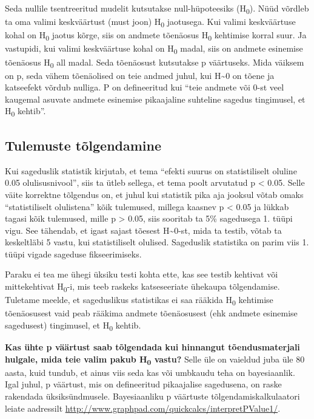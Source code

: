 \documentclass[]{book}
\begin{document}
Seda nullile tsentreeritud mudelit kutsutakse null-hüpoteesiks (H\textsubscript{0}).
Nüüd võrdleb ta oma valimi keskväärtust (must joon) H\textsubscript{0} jaotusega.
Kui valimi keskväärtuse kohal on H\textsubscript{0} jaotus kõrge, siis on andmete tõenäosus H\textsubscript{0} kehtimise korral suur.
Ja vastupidi, kui valimi keskväärtuse kohal on H\textsubscript{0} madal, siis on andmete esinemise tõenäosus H\textsubscript{0} all madal.
Seda tõenäosust kutsutakse p väärtuseks.
Mida väiksem on p, seda vähem tõenäolised on teie andmed juhul, kui H\textasciitilde{}0 on tõene ja katseefekt võrdub nulliga.
P on defineeritud kui ``teie andmete või 0-st veel kaugemal asuvate andmete esinemise pikaajaline suhteline sagedus tingimusel, et H\textsubscript{0} kehtib''.

\hypertarget{tulemuste-tolgendamine}{%
\subsection*{Tulemuste tõlgendamine}\label{tulemuste-tolgendamine}}

Kui sageduslik statistik kirjutab, et tema ``efekti suurus on statistiliselt oluline 0.05 olulisusnivool'', siis ta ütleb sellega, et tema poolt arvutatud p \textless{} 0.05.
Selle väite korrektne tõlgendus on, et juhul kui statistik pika aja jooksul võtab omaks ``statistiliselt olulistena'' kõik tulemused, millega kaasnev p \textless{} 0.05 ja lükkab tagasi kõik tulemused, mille p \textgreater{} 0.05, siis sooritab ta 5\% sagedusega 1. tüüpi vigu.
See tähendab, et igast sajast tõesest H\textasciitilde{}0-st, mida ta testib, võtab ta keskeltläbi 5 vastu, kui statistiliselt olulised.
Sageduslik statistika on parim viis 1. tüüpi vigade sageduse fikseerimiseks.

Paraku ei tea me ühegi üksiku testi kohta ette, kas see testib kehtivat või mittekehtivat H\textsubscript{0}-i, mis teeb raskeks katseseeriate ühekaupa tõlgendamise.
Tuletame meelde, et sageduslikus statistikas ei saa rääkida H\textsubscript{0} kehtimise tõenäosusest vaid peab rääkima andmete tõenäosusest (ehk andmete esinemise sagedusest) tingimusel, et H\textsubscript{0} kehtib.

\textbf{Kas ühte p väärtust saab tõlgendada kui hinnangut tõendusmaterjali hulgale, mida teie valim pakub H\textsubscript{0} vastu?}
Selle üle on vaieldud juba üle 80 aasta, kuid tundub, et ainus viis seda kas või umbkaudu teha on bayesiaanlik.
Igal juhul, p väärtust, mis on defineeritud pikaajalise sagedusena, on raske rakendada üksiksündmusele.
Bayesiaanliku p väärtuste tõlgendamiskalkulaatori leiate aadressilt \url{http://www.graphpad.com/quickcalcs/interpretPValue1/}.
\end{document}

